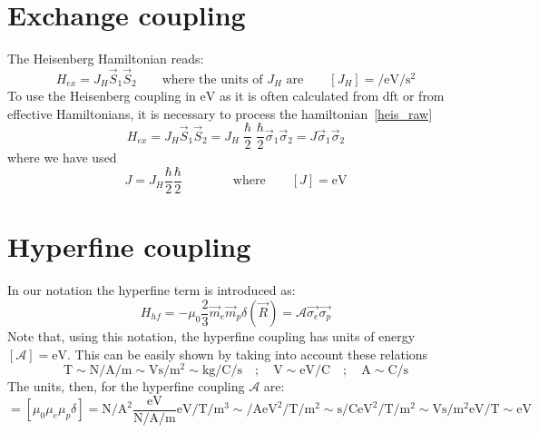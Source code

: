 \section{Exchange coupling}
The Heisenberg Hamiltonian reads:
\begin{equation}
  H_{ex} = J_H\vec{S}_1\vec{S}_2\qquad\text{where the units of $J_H$ are}\qquad
  [J_H]=\si{\per\eV\per\s\squared}
\label{heis_raw}
\end{equation}
To use the Heisenberg coupling in $\si{\eV}$ as it is often calculated from \ac{dft} or from effective Hamiltonians, it is necessary to process the hamiltonian~\eqref{heis_raw}
\begin{equation}
  H_{ex} = J_H\vec{S}_1\vec{S}_2 = J_H\frac{\hslash}{2}\frac{\hbar}{2}\vec{\sigma}_1\vec{\sigma}_2 =
  J\vec{\sigma}_1\vec{\sigma}_2
\end{equation}
where we have used
\begin{equation}
 J=J_H\frac{\hbar}{2}\frac{\hbar}{2}\qquad\qquad\text{where}\qquad [J]=\si{\eV}
\end{equation}


\section{Hyperfine coupling}
In our notation the hyperfine term is introduced as:
\begin{equation}
  H_{hf} = -\mu_0\frac{2}{3} \vec{m}_e\vec{m}_p\delta(\vec{R}) = \mathcal{A}\vec{\sigma_e}\vec{\sigma_p}
\end{equation}
Note that, using this notation, the hyperfine coupling has units of energy $[\mathcal{A}]=\si{\eV}$. This can be easily shown by taking into account these relations
\begin{equation}
  \si{\tesla} \sim
  \si{\newton\per\ampere\per\m}\sim\si{\volt\s\per\m\squared} \sim
  \si{\kilogram\per\coulomb\per\s}  \quad;\quad
  \si{\V}\sim\si{\eV\per\coulomb}  \quad;\quad
  \si{\ampere}\sim\si{\coulomb\per\s}
\end{equation}
The units, then, for the hyperfine coupling $\mathcal{A}$ are:
\begin{equation}
  [\mathcal{A}] = \left[\mu_0\mu_e\mu_p\delta\right] =
  \si{\newton\per\ampere\squared}\frac{\si{\eV}}{\si{\newton\per\ampere\per\m}}
  \si{\eV\per\tesla}\si{\per\m\cubed} \sim
  \si{\per\ampere}\si{\eV\squared\per\tesla}\si{\per\m\squared} \sim
  \si{\s\per\coulomb}\si{\eV\squared\per\tesla}\si{\per\m\squared} \sim
  \si{\V\s\per\m\squared}\si{\eV\per\tesla}\sim \si{\eV}
\end{equation}


